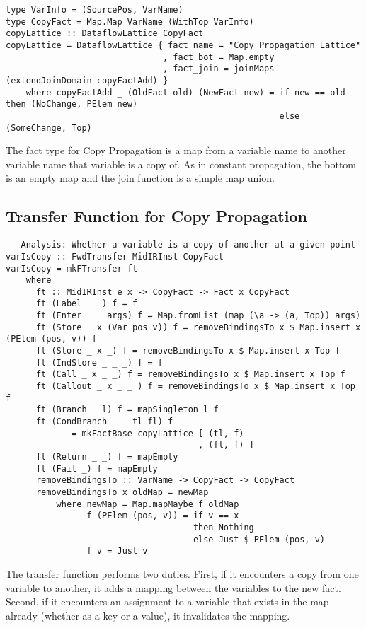 \documentclass[11pt]{article}
\begin{document}
{\small\begin{verbatim}
type VarInfo = (SourcePos, VarName)
type CopyFact = Map.Map VarName (WithTop VarInfo)
copyLattice :: DataflowLattice CopyFact
copyLattice = DataflowLattice { fact_name = "Copy Propagation Lattice"
                               , fact_bot = Map.empty
                               , fact_join = joinMaps (extendJoinDomain copyFactAdd) }
    where copyFactAdd _ (OldFact old) (NewFact new) = if new == old then (NoChange, PElem new)
                                                      else (SomeChange, Top)
\end{verbatim}}

The fact type for Copy Propagation is a map from a variable name to another variable name that variable is a copy of. As in constant propagation, the bottom is an empty map and the join function is a simple map union. 

\subsection { Transfer Function for Copy Propagation }

\begin{verbatim}
-- Analysis: Whether a variable is a copy of another at a given point 
varIsCopy :: FwdTransfer MidIRInst CopyFact 
varIsCopy = mkFTransfer ft 
    where 
      ft :: MidIRInst e x -> CopyFact -> Fact x CopyFact 
      ft (Label _ _) f = f 
      ft (Enter _ _ args) f = Map.fromList (map (\a -> (a, Top)) args)
      ft (Store _ x (Var pos v)) f = removeBindingsTo x $ Map.insert x (PElem (pos, v)) f 
      ft (Store _ x _) f = removeBindingsTo x $ Map.insert x Top f 
      ft (IndStore _ _ _) f = f 
      ft (Call _ x _ _) f = removeBindingsTo x $ Map.insert x Top f 
      ft (Callout _ x _ _ ) f = removeBindingsTo x $ Map.insert x Top f 
      ft (Branch _ l) f = mapSingleton l f 
      ft (CondBranch _ _ tl fl) f 
             = mkFactBase copyLattice [ (tl, f)
                                      , (fl, f) ]
      ft (Return _ _) f = mapEmpty 
      ft (Fail _) f = mapEmpty 
      removeBindingsTo :: VarName -> CopyFact -> CopyFact 
      removeBindingsTo x oldMap = newMap 
          where newMap = Map.mapMaybe f oldMap 
                f (PElem (pos, v)) = if v == x 
                                     then Nothing 
                                     else Just $ PElem (pos, v)
                f v = Just v
\end{verbatim}

The transfer function performs two duties. First, if it encounters a copy from one variable to another, it adds a mapping between the variables to the new fact. Second, if it encounters an assignment to a variable that exists in the map already (whether as a key or a value), it invalidates the mapping. 
\end{document}
